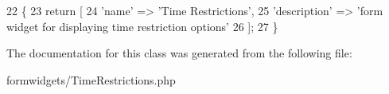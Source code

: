 \begin{DoxyCode}
22     \{
23         \textcolor{keywordflow}{return} [
24             \textcolor{stringliteral}{'name'}        => \textcolor{stringliteral}{'Time Restrictions'},
25             \textcolor{stringliteral}{'description'} => \textcolor{stringliteral}{'form widget for displaying time restriction options'}
26         ];
27     \}
\end{DoxyCode}


The documentation for this class was generated from the following file\-:\begin{DoxyCompactItemize}
\item 
formwidgets/Time\-Restrictions.\-php\end{DoxyCompactItemize}
